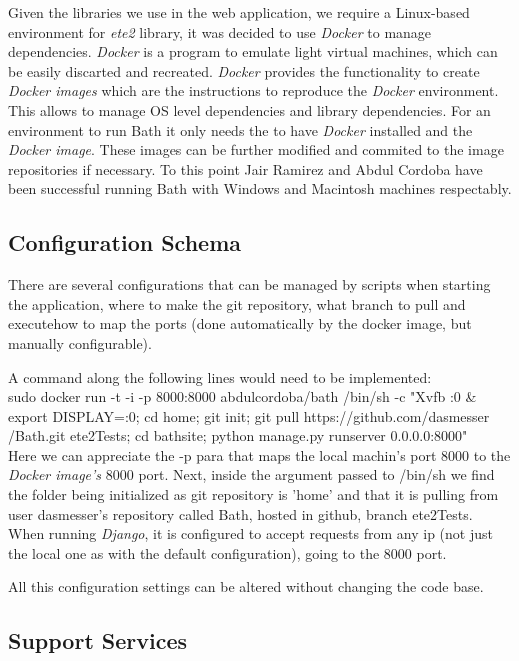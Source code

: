 \documentclass[10pt]{article}
\begin{document}
Given the libraries we use in the web application, we require a Linux-based environment for \textit{ete2} library, it was decided to use \textit{Docker} to manage dependencies. \textit{Docker} is a program to emulate light virtual machines, which can be easily discarted and recreated. \textit{Docker} provides the functionality to create \textit{Docker images} which are the instructions to reproduce the \textit{Docker} environment. 
This allows to manage OS level dependencies and library dependencies. For an environment to run Bath it only needs the to have \textit{Docker} installed and the \textit{Docker image}. These images can be further modified and commited to the image repositories if necessary.
To this point Jair Ramirez and Abdul Cordoba have been successful running Bath with Windows and Macintosh machines respectably.
 
 \subsection{Configuration Schema}
 
There are several configurations that can be managed by scripts when starting the application, where to make the git repository, what branch to pull and executehow to map the ports (done automatically by the docker image, but manually configurable).

A command along the following lines would need to be implemented:\\

sudo docker run -t -i -p 8000:8000 abdulcordoba/bath /bin/sh -c "Xvfb :0 \&
export DISPLAY=:0; cd home; git init; git pull https://github.com/dasmesser
/Bath.git ete2Tests; cd bathsite; python manage.py runserver 0.0.0.0:8000"\\

Here we can appreciate the -p para that maps the local machin's port 8000 to the \textit{Docker image's} 8000 port. Next, inside the argument passed to /bin/sh we find the folder being initialized as git repository is 'home' and that it is pulling from user dasmesser's repository called Bath, hosted in github, branch ete2Tests. When running \textit{Django}, it is configured to accept requests from any ip (not just the local one as with the default configuration), going to the 8000 port.

All this configuration settings can be altered without changing the code base.
 
 \subsection{Support Services}
 
\end{document}

